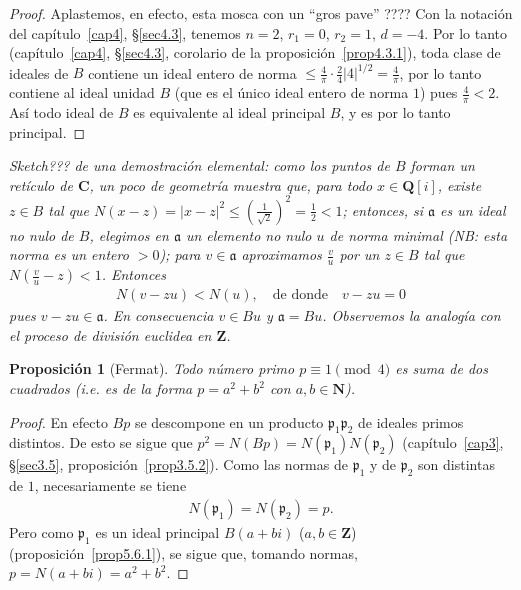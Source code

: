 \documentclass[10pt,oneside,bibtotoc,smallheadings,leqno,a5paper,DIV=12]{scrbook}
\newcommand{\QQ}{\mathbf{Q}}
\newcommand{\ZZ}{\mathbf{Z}}
\newcommand{\NN}{\mathbf{N}}
\newcommand{\CC}{\mathbf{C}}
\newcommand{\idl}[1]{\mathfrak{#1}}
\newcommand{\QED}{}%
\newcommand{\abs}[1]{\left\lvert#1\right\rvert}
\numberwithin{equation}{section}
\newenvironment{comm}%
	{\begin{trivlist}\item\small\itshape}
	{\end{trivlist}}
\theoremstyle{defi}
\theoremstyle{enonce}
\newtheorem{proposition}{Proposici\'on}
\theoremstyle{rem}
\numberwithin{theorem}{section}
\numberwithin{proposition}{section}
\numberwithin{definition}{section}
\numberwithin{lemma}{section}
\numberwithin{corollary}{section}
\numberwithin{example}{section}
\numberwithin{footnote}{section}%
\begin{document}
\begin{proof}
Aplastemos, en efecto, esta mosca con un ``gros pave'' ???? Con la notaci\'on del cap\'itulo~\ref{cap4},
\S\ref{sec4.3}, tenemos $n=2$, $r_{1}=0$, $r_{2}=1$, $d=-4$. Por lo tanto (cap\'itulo~\ref{cap4}, \S\ref{sec4.3},
corolario de la proposici\'on~\ref{prop4.3.1}),
toda clase de ideales de $B$ contiene un ideal entero de norma $\leq\frac{4}{\pi}\cdot\frac{2}{4}
\abs{4}^{1/2}=\frac{4}{\pi}$, por lo tanto contiene al ideal unidad $B$ (que es el \'unico ideal entero de
norma $1$) pues $\frac{4}{\pi}<2$. As\'i todo ideal de $B$ es equivalente al ideal principal $B$, y es por
lo tanto principal. \QED
\end{proof}

\begin{comm}
{\em Sketch???} de una demostraci\'on elemental: como los puntos de $B$ forman un ret\'iculo de $\CC$,
un poco de geometr\'ia muestra que, para todo $x\in\QQ[i]$, existe $z\in B$ tal que
$N(x-z)=\abs{x-z}^{2}\leq\left(\frac{1}{\sqrt{2}}\right)^{2}=\frac{1}{2}< 1$; entonces, si $\idl{a}$ es un
ideal no nulo de $B$, elegimos en $\idl{a}$ un elemento no nulo $u$ de norma minimal (NB: esta norma es un
entero $>0$); para $v\in\idl{a}$ aproximamos $\frac{v}{u}$ por un $z\in B$ tal que $N\left(\frac{v}{u}-z\right)<1$.
Entonces
\begin{gather*}
N(v-zu) < N(u),\quad\text{de donde}\quad v-zu=0
\end{gather*}
pues $v-zu\in\idl{a}$. En consecuencia $v\in Bu$ y $\idl{a}=Bu$. Observemos la analog\'ia con el proceso de
divisi\'on euclidea en $\ZZ$.
\end{comm}

\begin{proposition}[Fermat]\label{prop5.6.2}
Todo n\'umero primo $p\equiv 1\pmod 4$ es suma de dos cuadrados (i.e. es de la forma $p=a^{2}+b^{2}$ con
$a,b\in\NN$).
\end{proposition}

\begin{proof}
En efecto $Bp$ se descompone en un producto $\idl{p}_{1}\idl{p}_{2}$ de ideales primos distintos.
De esto se sigue que $p^{2}=N(Bp) = N(\idl{p}_{1})N(\idl{p}_{2})$ (cap\'itulo~\ref{cap3}, \S\ref{sec3.5},
proposici\'on~\ref{prop3.5.2}).
Como las normas de $\idl{p}_{1}$ y de $\idl{p}_{2}$ son distintas de $1$, necesariamente se tiene
\begin{gather*}
N(\idl{p}_{1}) = N(\idl{p}_{2}) = p.
\end{gather*}
Pero como $\idl{p}_{1}$ es un ideal principal $B(a+bi)$ ($a,b\in\ZZ$)
(proposici\'on~\ref{prop5.6.1}), se sigue que, tomando
normas, $p = N(a+bi)=a^{2}+b^{2}$. \QED
\end{proof}
\end{document}
